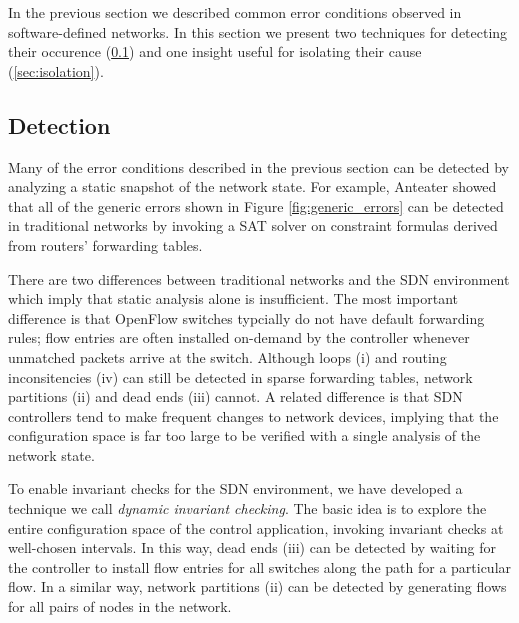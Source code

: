 
In the previous section we described common error conditions observed in
software-defined networks. In this section we present two techniques for
detecting their occurence (\ref{sec:detection}) and one insight useful for isolating their cause
(\ref{sec:isolation}).

\subsection{Detection}
\label{sec:detection}

Many of the error conditions described in the previous section can be detected
by analyzing a static snapshot of the network state. For example, Anteater \cite{anteater}
showed that all of the generic errors shown in Figure
\ref{fig:generic_errors} can be detected in traditional networks by invoking a
SAT solver on constraint formulas derived from routers' forwarding tables.

There are two differences between traditional networks and the SDN environment
which imply that static analysis alone is insufficient. The most important
difference is that OpenFlow switches typcially do not have default forwarding
rules; flow entries are often installed on-demand by the controller
whenever unmatched packets arrive at the switch. Although loops (i) and
routing inconsitencies (iv) can still be detected in sparse forwarding tables,
network partitions  (ii) and dead ends (iii) cannot. A related difference is that
SDN controllers tend to make frequent changes to network devices, implying that the
configuration space is far too large to be verified with a single analysis of
the network state.

To enable invariant checks for the SDN environment, we have developed a
technique we call {\it dynamic invariant checking}. The basic idea is to
explore the entire configuration space of the control application, invoking
invariant checks at well-chosen intervals. In this way, dead ends (iii) can be
detected by waiting for the controller to install flow entries for all
switches along the path for a particular flow. In a similar way, network
partitions (ii) can be detected by generating flows for all pairs of nodes in
the network. 


